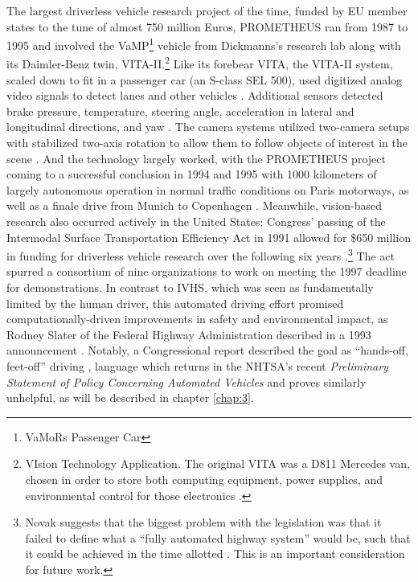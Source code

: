 The largest driverless vehicle 
research project of the time, funded by EU member states to the tune
of almost 750 million Euros, PROMETHEUS ran from 1987 to 1995 and
involved the VaMP\footnote{VaMoRs Passenger Car} vehicle from
Dickmanns's research lab along with its 
Daimler-Benz twin, VITA-II.\footnote{VIsion Technology Application. The original VITA was a
  D811 Mercedes van, chosen in order to store both computing
  equipment, power supplies, and environmental control for those
  electronics \cite[p. 37]{ulmerVITA}.} Like its forebear VITA, the VITA-II
system, scaled down to fit in 
a passenger car (an S-class SEL 500), used digitized analog
video signals to detect lanes and other vehicles \cite[p.
  2]{ulmerVITA-II}. Additional sensors 
detected brake pressure, temperature, steering angle, acceleration in
lateral and longitudinal directions, and yaw \cite[p.
  2]{ulmerVITA-II}. The camera systems
utilized two-camera setups with stabilized two-axis rotation to allow
them to follow objects of interest in the scene \cite{cameraPlatform}. And the
technology largely worked, with the PROMETHEUS project coming to a
successful conclusion in 1994 and 1995 with 1000 kilometers of largely
autonomous operation in normal traffic conditions on Paris motorways,
as well as a finale drive from Munich to Copenhagen \cite{makingBertha}.
Meanwhile, vision-based research also occurred actively in the United States;
Congress' passing of the Intermodal 
Surface Transportation Efficiency Act in 1991 allowed for \$650 million
in funding for driverless vehicle research over the following six
years
\cite{novakAlmost}.\footnote{Novak suggests that the biggest problem with
the legislation was that it failed to define what a ``fully automated
highway system'' would be, such that it could be achieved in the time
allotted \cite{novakAlmost}. This is an important consideration for
future work.} The act spurred a consortium of nine organizations to
work on meeting the 1997 deadline for demonstrations. In contrast to
IVHS, which was seen as fundamentally limited by the human driver,
this automated driving effort promised computationally-driven
improvements in safety and environmental impact, as Rodney Slater of
the Federal Highway Administration described in a 1993 announcement
\cite[p. 30]{wetmore}.
Notably, a Congressional report described the goal as ``hands-off,
feet-off'' driving \cite{novakAlmost}, language which returns in the NHTSA's recent
\emph{Preliminary Statement of Policy Concerning Automated Vehicles}
and proves similarly unhelpful, as will be described in chapter
\ref{chap:3}.

